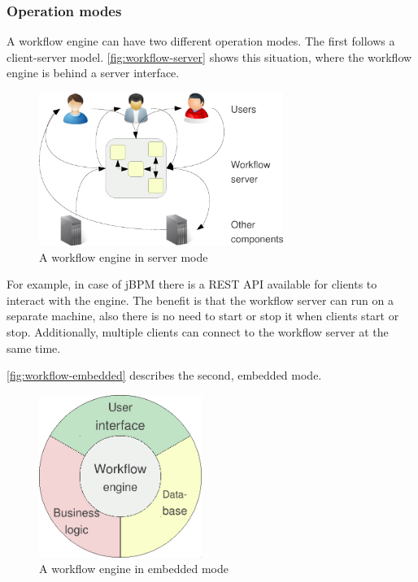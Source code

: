\subsubsection*{Operation modes}

A workflow engine can have two different operation modes. The first follows a
client-server model. \autoref{fig:workflow-server} shows this situation,
where the workflow engine is behind a server interface.

\begin{figure}[H]
\centering
\includegraphics[width=300px,keepaspectratio]{workflow-server.pdf}
\caption{A workflow engine in server mode}
\label{fig:workflow-server}
\end{figure}

For example, in case of jBPM there is a REST API available for clients to
interact with the engine. The benefit is that the workflow server can run on a
separate machine, also there is no need to start or stop it when clients start or stop.
Additionally, multiple clients can connect to the workflow server at the same
time.

\autoref{fig:workflow-embedded} describes the second, embedded mode.

\begin{figure}[H]
\centering
\includegraphics[width=200px,keepaspectratio]{workflow-embedded.pdf}
\caption{A workflow engine in embedded mode}
\label{fig:workflow-embedded}
\end{figure}

